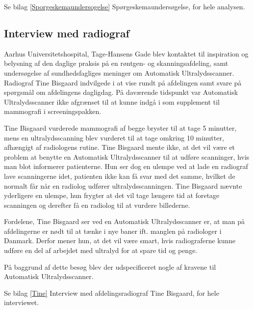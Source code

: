 Se bilag \ref{Sporgeskemaundersogelse} Spørgeskemaundersøgelse, for hele analysen. 

\subsection{Interview med radiograf} 
Aarhus Universitetshospital, Tage-Hansens Gade blev kontaktet til inspiration og belysning af den daglige praksis på en røntgen- og skanningsafdeling, samt undersøgelse af sundhedsfagliges meninger om Automatisk Ultralydsscanner. Radiograf Tine Bisgaard indvilgede i at vise rundt på afdelingen samt svare på spørgsmål om afdelingens dagligdag. På daværende tidspunkt var Automatisk Ultralydsscanner ikke afgrænset til at kunne indgå i som supplement til mammografi i screeningspakken. 

Tine Bisgaard vurderede mammografi af begge bryster til at tage 5 minutter, mens en ultralydsscanning blev vurderet til at tage omkring 10 minutter, afhængigt af radiologens rutine. Tine Bisgaard mente ikke, at det vil være et problem at benytte en Automatisk Ultralydsscanner til at udføre scanninger, hvis man blot informerer patienterne. Hun ser dog en ulempe ved at lade en radiograf lave scanningerne idet, patienten ikke kan få svar med det samme, hvilket de normalt får når en radiolog udfører ultralydsscanningen. Tine Bisgaard nævnte yderligere en ulempe, hun frygter at det vil tage længere tid at foretage scanningen og derefter få en radiolog til at vurdere billederne.

Fordelene, Tine Bisgaard ser ved en Automatisk Ultralydsscanner er, at man på afdelingerne er nødt til at tænke i nye baner ift. manglen på radiologer i Danmark. Derfor mener hun, at det vil være smart, hvis radiograferne kunne udføre en del af arbejdet med ultralyd for at spare tid og penge.

På baggrund af dette besøg blev der udspecificeret nogle af kravene til Automatisk Ultralydsscanner.

Se bilag \ref{Tine} Interview med afdelingsradiograf Tine Bisgaard, for hele interviewet. 

